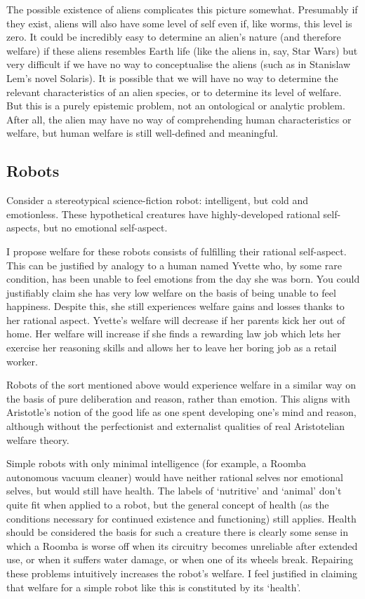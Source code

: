 \documentclass{article}
\begin{document}
The possible existence of aliens complicates this picture somewhat. Presumably if they exist, aliens will also have some level of self \textemdash{} even if, like worms, this level is zero. It could be incredibly easy to determine an alien's nature (and therefore welfare) if these aliens resembles Earth life (like the aliens in, say, Star Wars) but very difficult if we have no way to conceptualise the aliens (such as in Stanislaw Lem's novel Solaris). It is possible that we will have no way to determine the relevant characteristics of an alien species, or to determine its level of welfare. But this is a purely epistemic problem, not an ontological or analytic problem. After all, the alien may have no way of comprehending human characteristics or welfare, but human welfare is still well-defined and meaningful.

\subsection{Robots}

Consider a stereotypical science-fiction robot: intelligent, but cold and emotionless. These hypothetical creatures have highly-developed rational self-aspects, but no emotional self-aspect.

I propose welfare for these robots consists of fulfilling their rational self-aspect. This can be justified by analogy to a human named Yvette who, by some rare condition, has been unable to feel emotions from the day she was born. You could justifiably claim she has very low welfare on the basis of being unable to feel happiness. Despite this, she still experiences welfare gains and losses thanks to her rational aspect. Yvette's welfare will decrease if her parents kick her out of home. Her welfare will increase if she finds a rewarding law job which lets her exercise her reasoning skills and allows her to leave her boring job as a retail worker. 

Robots of the sort mentioned above would experience welfare in a similar way \textemdash{} on the basis of pure deliberation and reason, rather than emotion. This aligns with Aristotle's notion of the good life as one spent developing one's mind and reason, although without the perfectionist and externalist qualities of real Aristotelian welfare theory. 

Simple robots with only minimal intelligence (for example, a Roomba autonomous vacuum cleaner) would have neither rational selves nor emotional selves, but would still have health. The labels of `nutritive' and `animal' don't quite fit when applied to a robot, but the general concept of health (as the conditions necessary for continued existence and functioning) still applies. Health should be considered the basis for such a creature \textemdash{} there is clearly some sense in which a Roomba is worse off when its circuitry becomes unreliable after extended use, or when it suffers water damage, or when one of its wheels break. Repairing these problems intuitively increases the robot's welfare. I feel justified in claiming that welfare for a simple robot like this is constituted by its `health'.
\end{document}
